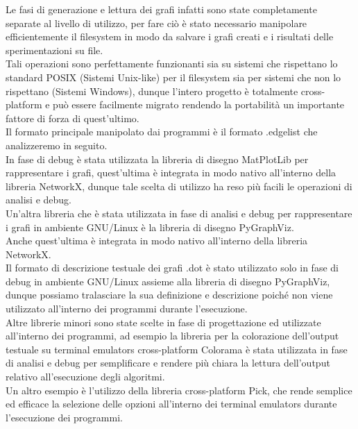 Le fasi di generazione e lettura dei grafi infatti sono state completamente separate al livello di utilizzo, per fare ciò è stato necessario manipolare efficientemente il filesystem in modo da salvare i grafi creati e i risultati delle sperimentazioni su file.\\

Tali operazioni sono perfettamente funzionanti sia su sistemi che rispettano lo standard POSIX (Sistemi Unix-like) per il filesystem sia per sistemi che non lo rispettano (Sistemi Windows), dunque l'intero progetto è totalmente cross-platform e può essere facilmente migrato rendendo la portabilità un importante fattore di forza di quest'ultimo.\\

Il formato principale manipolato dai programmi è il formato .edgelist che analizzeremo in seguito.\\

In fase di debug è stata utilizzata la libreria di disegno MatPlotLib per rappresentare i grafi, quest'ultima è integrata in modo nativo all'interno della libreria NetworkX, dunque tale scelta di utilizzo ha reso più facili le operazioni di analisi e debug.\\

Un'altra libreria che è stata utilizzata in fase di analisi e debug per rappresentare i grafi in ambiente GNU/Linux è la libreria di disegno PyGraphViz.\\

Anche quest'ultima è integrata in modo nativo all'interno della libreria NetworkX.\\

Il formato di descrizione testuale dei grafi .dot è stato utilizzato solo in fase di debug in ambiente GNU/Linux assieme alla libreria di disegno PyGraphViz, dunque possiamo tralasciare la sua definizione e descrizione poiché non viene utilizzato all'interno dei programmi durante l'esecuzione.\\

Altre librerie minori sono state scelte in fase di progettazione ed utilizzate all'interno dei programmi, ad esempio la libreria per la colorazione dell'output testuale su terminal emulators cross-platform Colorama è stata utilizzata in fase di analisi e debug per semplificare e rendere più chiara la lettura dell'output relativo all'esecuzione degli algoritmi.\\

Un altro esempio è l'utilizzo della libreria cross-platform Pick, che rende semplice ed efficace la selezione delle opzioni all'interno dei terminal emulators durante l'esecuzione dei programmi.\\

